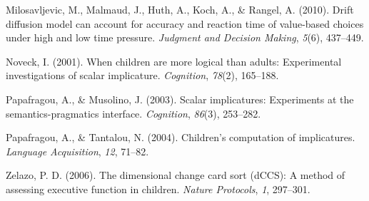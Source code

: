 \documentclass[10pt, letterpaper]{article}
\begin{document}
Milosavljevic, M., Malmaud, J., Huth, A., Koch, A., \& Rangel, A.
(2010). Drift diffusion model can account for accuracy and reaction time
of value-based choices under high and low time pressure. \emph{Judgment
and Decision Making}, \emph{5}(6), 437--449.

Noveck, I. (2001). When children are more logical than adults:
Experimental investigations of scalar implicature. \emph{Cognition},
\emph{78}(2), 165--188.

Papafragou, A., \& Musolino, J. (2003). Scalar implicatures: Experiments
at the semantics-pragmatics interface. \emph{Cognition}, \emph{86}(3),
253--282.

Papafragou, A., \& Tantalou, N. (2004). Children's computation of
implicatures. \emph{Language Acquisition}, \emph{12}, 71--82.

Zelazo, P. D. (2006). The dimensional change card sort (dCCS): A method
of assessing executive function in children. \emph{Nature Protocols},
\emph{1}, 297--301.
\end{document}
